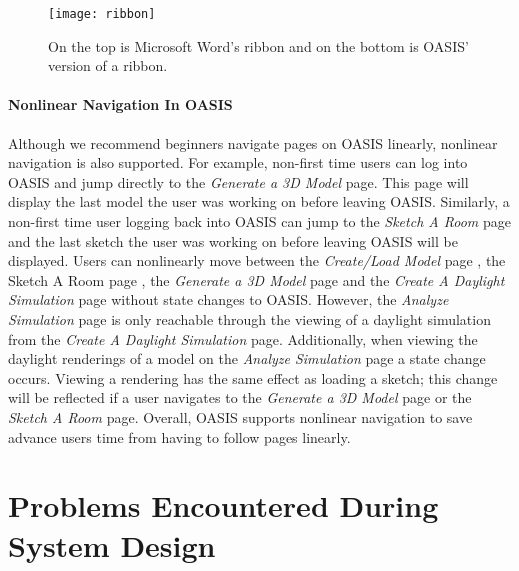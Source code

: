 \begin{figure}[!ht]
\centering
\texttt{[image: ribbon]}
\caption{On the top is Microsoft Word's ribbon and on the bottom is OASIS' version of a ribbon.}
\label{fig:ribbon}
\end{figure}

\paragraph{Nonlinear Navigation In OASIS}
Although we recommend beginners navigate pages on OASIS linearly, nonlinear navigation is also supported. For example, non-first time users can log into OASIS and jump directly to the \textit{Generate a 3D Model} page. This page will display the last model the user was working on before leaving OASIS. Similarly, a non-first time user logging back into OASIS can jump to the \textit{Sketch A Room} page and the last sketch the user was working on before leaving OASIS will be displayed.  Users can nonlinearly move between the \textit{Create/Load Model} page ,  the {Sketch A Room} page , the \textit{Generate a 3D Model} page and the \textit{Create A Daylight Simulation} page without state changes to OASIS. However, the \textit{Analyze Simulation} page is only reachable through the viewing of a daylight simulation from the \textit{Create A Daylight Simulation} page. Additionally, when viewing the daylight renderings of a model on the \textit{Analyze Simulation} page a state change occurs. Viewing a rendering has the same effect as loading a sketch; this change will be reflected if a user navigates to the \textit{Generate a 3D Model} page or the \textit{Sketch A Room} page. Overall, OASIS supports nonlinear navigation to save advance users time from having to follow pages linearly.  \\ 



\section{Problems Encountered During System Design}

